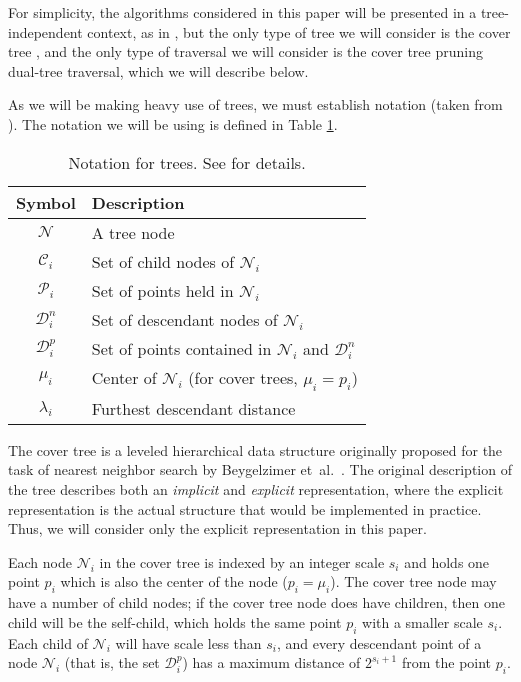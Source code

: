 For simplicity, the algorithms considered in this paper will be presented in a
tree-independent context, as in \cite{curtin2013tree}, but the only type of tree
we will consider is the cover tree \cite{langford2006}, and the only type of
traversal we will consider is the cover tree pruning dual-tree traversal, which
we will describe below.

As we will be making heavy use of trees, we must establish notation (taken from
\cite{curtin2013tree}).  The notation we will be using is defined in Table
\ref{tab:notation}.

\begin{table}
{\small
\begin{center}
\begin{tabular}{|c|l|}
\hline
{\bf Symbol} & {\bf Description} \\ \hline
$\mathscr{N}$ & A tree node \\ \hline
$\mathscr{C}_i$ & Set of child nodes of $\mathscr{N}_i$ \\ \hline
$\mathscr{P}_i$ & Set of points held in $\mathscr{N}_i$ \\ \hline
$\mathscr{D}_i^n$ & Set of descendant nodes of $\mathscr{N}_i$ \\ \hline
$\mathscr{D}_i^p$ & Set of points contained in $\mathscr{N}_i$ and
$\mathscr{D}_i^n$ \\ \hline
$\mu_i$ & Center of $\mathscr{N}_i$ (for cover trees, $\mu_i = p_i$) \\ \hline
$\lambda_i$ & Furthest descendant distance \\ \hline
\end{tabular}
\end{center}
}
\caption{Notation for trees.  See \cite{curtin2013tree} for details.}
\label{tab:notation}
\end{table}

The cover tree is a leveled hierarchical data structure originally proposed for
the task of nearest neighbor search by Beygelzimer
et~al.~\cite{langford2006}.  The original description of the tree describes both
an {\it implicit} and {\it explicit} representation, where the explicit
representation is the actual structure that would be implemented in practice.
Thus, we will consider only the explicit representation in this paper.

Each node $\mathscr{N}_i$ in the cover tree is indexed by an integer scale $s_i$
and holds one point $p_i$ which is also the center of the node ($p_i = \mu_i$).
The cover tree node may have a number of child nodes; if the cover tree node
does have children, then one child will be the self-child, which holds the same
point $p_i$ with a smaller scale $s_i$.  Each child of $\mathscr{N}_i$ will have
scale less than $s_i$, and every descendant point of a node $\mathscr{N}_i$
(that is, the set $\mathscr{D}_i^p$) has a maximum distance of $2^{s_i + 1}$
from the point $p_i$.

